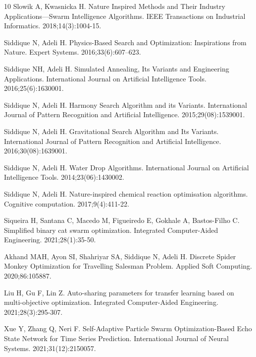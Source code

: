 \documentclass[icae]{iosart2x}
\begin{document}
\begin{thebibliography}{10}
Slowik A, Kwasnicka H.
\newblock Nature Inspired Methods and Their Industry Applications—Swarm
  Intelligence Algorithms.
\newblock IEEE Transactions on Industrial Informatics. 2018;14(3):1004-15.

Siddique N, Adeli H.
\newblock Physics-Based Search and Optimization: Inspirations from Nature.
\newblock Expert Systems. 2016;33(6):607–623.

Siddique NH, Adeli H.
\newblock Simulated Annealing, Its Variants and Engineering Applications.
\newblock International Journal on Artificial Intelligence Tools.
  2016;25(6):1630001.

Siddique N, Adeli H.
\newblock Harmony Search Algorithm and its Variants.
\newblock International Journal of Pattern Recognition and Artificial
  Intelligence. 2015;29(08):1539001.

Siddique N, Adeli H.
\newblock Gravitational Search Algorithm and Its Variants.
\newblock International Journal of Pattern Recognition and Artificial
  Intelligence. 2016;30(08):1639001.

Siddique N, Adeli H.
\newblock Water Drop Algorithms.
\newblock International Journal on Artificial Intelligence Tools.
  2014;23(06):1430002.

Siddique N, Adeli H.
\newblock Nature-inspired chemical reaction optimisation algorithms.
\newblock Cognitive computation. 2017;9(4):411-22.

Siqueira H, Santana C, Macedo M, Figueiredo E, Gokhale A, Bastos-Filho C.
\newblock Simplified binary cat swarm optimization.
\newblock Integrated Computer-Aided Engineering. 2021;28(1):35-50.

Akhand MAH, Ayon SI, Shahriyar SA, Siddique N, Adeli H.
\newblock Discrete Spider Monkey Optimization for Travelling Salesman Problem.
\newblock Applied Soft Computing. 2020;86:105887.

Liu H, Gu F, Lin Z.
\newblock Auto-sharing parameters for transfer learning based on
  multi-objective optimization.
\newblock Integrated Computer-Aided Engineering. 2021;28(3):295-307.

Xue Y, Zhang Q, Neri F.
\newblock Self-Adaptive Particle Swarm Optimization-Based Echo State Network
  for Time Series Prediction.
\newblock International Journal of Neural Systems. 2021;31(12):2150057.


\end{thebibliography}
\end{document}
